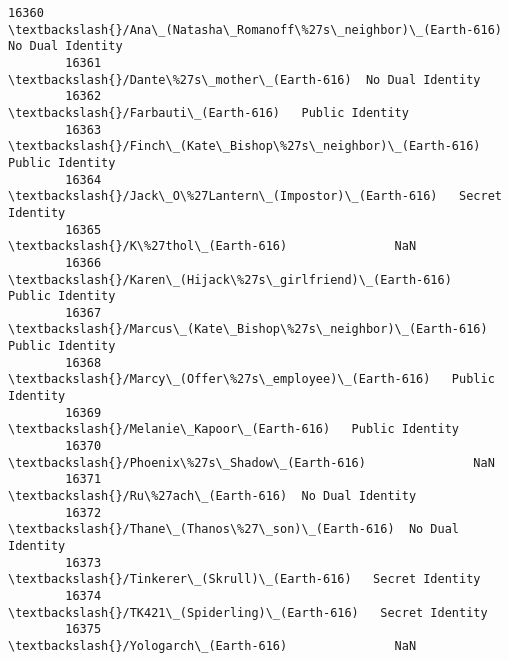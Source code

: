 \documentclass[11pt]{article}
\begin{document}
\begin{Verbatim}[commandchars=\\\{\}]
        16360  \textbackslash{}/Ana\_(Natasha\_Romanoff\%27s\_neighbor)\_(Earth-616)  No Dual Identity   
        16361                     \textbackslash{}/Dante\%27s\_mother\_(Earth-616)  No Dual Identity   
        16362                             \textbackslash{}/Farbauti\_(Earth-616)   Public Identity   
        16363     \textbackslash{}/Finch\_(Kate\_Bishop\%27s\_neighbor)\_(Earth-616)   Public Identity   
        16364          \textbackslash{}/Jack\_O\%27Lantern\_(Impostor)\_(Earth-616)   Secret Identity   
        16365                             \textbackslash{}/K\%27thol\_(Earth-616)               NaN   
        16366        \textbackslash{}/Karen\_(Hijack\%27s\_girlfriend)\_(Earth-616)   Public Identity   
        16367    \textbackslash{}/Marcus\_(Kate\_Bishop\%27s\_neighbor)\_(Earth-616)   Public Identity   
        16368           \textbackslash{}/Marcy\_(Offer\%27s\_employee)\_(Earth-616)   Public Identity   
        16369                       \textbackslash{}/Melanie\_Kapoor\_(Earth-616)   Public Identity   
        16370                   \textbackslash{}/Phoenix\%27s\_Shadow\_(Earth-616)               NaN   
        16371                             \textbackslash{}/Ru\%27ach\_(Earth-616)  No Dual Identity   
        16372                \textbackslash{}/Thane\_(Thanos\%27\_son)\_(Earth-616)  No Dual Identity   
        16373                    \textbackslash{}/Tinkerer\_(Skrull)\_(Earth-616)   Secret Identity   
        16374                   \textbackslash{}/TK421\_(Spiderling)\_(Earth-616)   Secret Identity   
        16375                            \textbackslash{}/Yologarch\_(Earth-616)               NaN   
        

\end{Verbatim}
\end{document}

